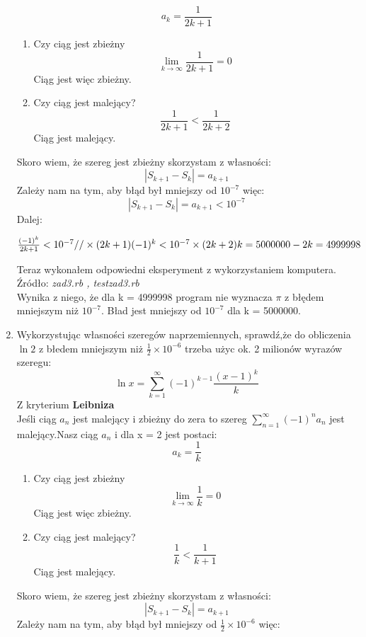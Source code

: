 \documentclass[fleqn]{article}
\begin{document}
\begin{enumerate}
  \[a_{k}=\frac{1}{2k+1}\]
   \begin{enumerate}
   \item Czy ciąg jest zbieżny
   \[\lim_{k \rightarrow \infty}\frac{1}{2k+1} = 0\]
   Ciąg jest więc zbieżny.
   \item Czy ciąg jest malejący?
   \[\frac{1}{2k+1} < \frac{1}{2k+2}\]
   Ciąg jest malejący.
   \end{enumerate}
   Skoro wiem, że szereg jest zbieżny skorzystam z własności:
   \[|S_{k+1} - S_{k}| = a_{k+1}\]
   Zależy nam na tym, aby błąd był mniejszy od $10^{-7}$ więc:
   \[|S_{k+1} - S_{k}| = a_{k+1} < 10^{-7}\]
   Dalej:\\
   \begin{center}
   $
   \frac{(-1)^{k}}{2k+1} <10^{-7} //\times(2k+1)  \newline
   (-1)^k <10^{-7}\times(2k+2) \newline
   k = 5000000 - 2 \newline 
   k = 4999998\newline
   $ \end{center}
    Teraz wykonałem odpowiedni eksperyment z wykorzystaniem komputera.\\
    Źródło: \emph{zad3.rb , testzad3.rb} \\
    Wynika z niego, że dla k = 4999998 program nie wyznacza $\pi$ z błędem mniejszym niż $ 10^{-7} $. Bład jest mniejszy od $ 10^{-7} $ dla k = 5000000.
  \item Wykorzystując własności szeregów naprzemiennych, sprawdź,że do obliczenia $ \ln2 $ z błedem mniejszym niż
  $\frac{1}{2}\times 10^{-6} $ trzeba użyc ok. 2 milionów wyrazów szeregu:\\
  \[\ln x = \sum_{k=1}^\infty(-1)^{k-1}\frac{(x-1)^k}{k}\]
   Z kryterium \textbf{Leibniza}\\
   Jeśli ciąg $a_{n}$ jest malejący i zbieżny do zera to szereg $\sum_{n=1}^\infty(-1)^{n}a_{n}$ jest malejący.Nasz ciąg $a_{n}$ i dla x = 2 jest postaci:
   \[a_{k} = \frac{1}{k}\]
    \begin{enumerate}
   \item Czy ciąg jest zbieżny
   \[\lim_{k \rightarrow \infty}\frac{1}{k} = 0\]
   Ciąg jest więc zbieżny.
   \item Czy ciąg jest malejący?
   \[\frac{1}{k} < \frac{1}{k+1}\]
   Ciąg jest malejący.
   \end{enumerate}
     Skoro wiem, że szereg jest zbieżny skorzystam z własności:
   \[|S_{k+1} - S_{k}| = a_{k+1}\]
    Zależy nam na tym, aby błąd był mniejszy od $\frac{1}{2}\times 10^{-6}$ więc:

\end{enumerate}
\end{document}
